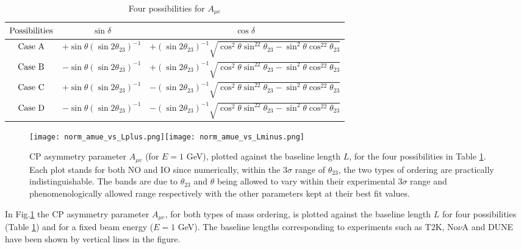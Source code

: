\documentclass[11pt]{article}
\begin{document}
\begin{table}[H]
\begin{center}
\caption{Four possibilities for $A_{\mu e}$} \label{axe}
 \begin{tabular}{|c|c|c|} 
\hline 
${\rm Possibilities}$&$\sin\delta$&$\cos\delta$\\
\hline
${\rm Case~ A}$&$+\sin\theta(\sin2\theta_{23})^{-1}$&$+(\sin2\theta_{23})^{-1}\sqrt{\cos^2\theta\sin^22\theta_{23}-\sin^2\theta\cos^22\theta_{23}}$\\
\hline
${\rm Case~ B}$&$-\sin\theta(\sin2\theta_{23})^{-1}$&$+(\sin2\theta_{23})^{-1}\sqrt{\cos^2\theta\sin^22\theta_{23}-\sin^2\theta\cos^22\theta_{23}}$\\
\hline
${\rm Case~ C}$ & $+\sin\theta(\sin2\theta_{23})^{-1}$ & $-(\sin2\theta_{23})^{-1}\sqrt{\cos^2\theta\sin^22\theta_{23}-\sin^2\theta\cos^22\theta_{23}}$\\
\hline
${\rm Case~ D}$&$-\sin\theta(\sin2\theta_{23})^{-1}$&$-(\sin2\theta_{23})^{-1}\sqrt{\cos^2\theta\sin^22\theta_{23}-\sin^2\theta\cos^22\theta_{23}}$\\
\hline
\end{tabular} 
\end{center} 
\end{table}
\noindent


\begin{figure}[H]
\begin{center}
\texttt{[image: norm\_amue\_vs\_Lplus.png]}\texttt{[image: norm\_amue\_vs\_Lminus.png]}
\caption{CP asymmetry parameter $A_{\mu e}$ (for $E=1$ GeV), plotted against the baseline length $L$, for the four possibilities in Table \ref{axe}. Each plot stands for both NO and IO since numerically, within the $3\sigma$ range of $\theta_{23}$, the two types of ordering are practically indistinguishable. The bands are due to $\theta_{23}$ and $\theta$ being allowed to vary within their experimental $3\sigma$ range and phenomenologically allowed range respectively with the other parameters kept at their best fit values.}\label{fig8}
\end{center}
\end{figure} 

In Fig.\ref{fig8} the CP asymmetry parameter $A_{\mu e}$, for both types of mass ordering, is plotted against the baseline length $L$ for four possibilities (Table \ref{axe}) and for a fixed beam energy ($E=1$ GeV). The baseline lengths corresponding to experiments such as T2K, No$\nu$A and DUNE have been shown by vertical lines in the figure. 
\end{document}
